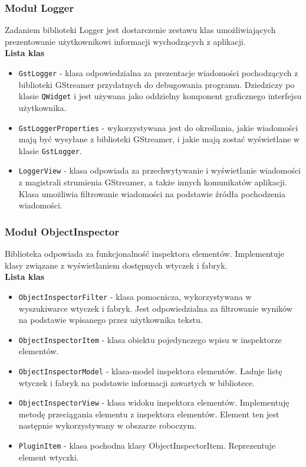 \documentclass[12pt]{article}
\begin{document}
\subsubsection{Moduł Logger}
Zadaniem biblioteki Logger jest dostarczenie zestawu klas umożliwiających prezentowanie użytkownikowi informacji wychodzących z aplikacji. \\
\textbf{Lista klas}
\begin{itemize}
  \setlength{\itemsep}{0em}
\item \texttt{GstLogger} - klasa odpowiedzialna za prezentacje wiadomości pochodzących z biblioteki GStreamer przydatnych do debugowania programu. Dziedziczy po klasie \texttt{QWidget} i jest używana jako oddzielny komponent graficznego interfejsu użytkownika.
\item \texttt{GstLoggerProperties} - wykorzystywana jest do określania, jakie wiadomości mają być wysyłane z biblioteki GStreamer, i jakie mają zostać wyświetlane w klasie \texttt{GstLogger}.
\item \texttt{LoggerView} - klasa odpowiada za przechwytywanie i wyświetlanie wiadomości z magistrali strumienia GStreamer, a także innych komunikatów aplikacji. Klasa umożliwia filtrowanie wiadomości na podstawie źródła pochodzenia wiadomości.
\end{itemize}
\subsubsection{Moduł ObjectInspector}
Biblioteka odpowiada za funkcjonalność inspektora elementów. Implementuje klasy związane z wyświetlaniem dostępnych wtyczek i fabryk.\\
\textbf{Lista klas}
\begin{itemize}
  \setlength{\itemsep}{0em}
\item \texttt{ObjectInspectorFilter} - klasa pomocnicza, wykorzystywana w wyszukiwarce wtyczek i fabryk. Jest odpowiedzialna za filtrowanie wyników na podstawie wpisanego przez użytkownika tekstu.
\item \texttt{ObjectInspectorItem} - klasa obiektu pojedynczego wpisu w inspektorze elementów. 
\item \texttt{ObjectInspectorModel} - klasa-model inspektora elementów. Ładuje listę wtyczek i fabryk na podstawie informacji zawartych w bibliotece.
\item \texttt{ObjectInspectorView} - klasa widoku inspektora elementów. Implementuję metodę przeciągania elementu z inspektora elementów. Element ten jest następnie wykorzystywany w obszarze roboczym.
\item \texttt{PluginItem} - klasa pochodna klasy ObjectInspectorItem. Reprezentuje element wtyczki.
\end{itemize}  
\end{document}
